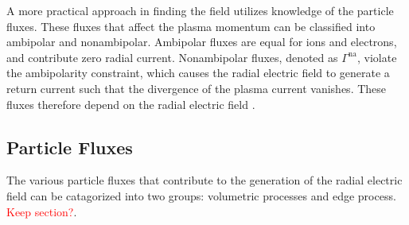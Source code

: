 \documentclass[a4paper]{article}
\newcommand\mynotes[1]{\textcolor{red}{#1}}
\begin{document}
A more practical approach in finding the field utilizes knowledge of the particle fluxes.
These fluxes that affect the plasma momentum can be classified into ambipolar and nonambipolar.
Ambipolar fluxes are equal for ions and electrons, and contribute zero radial current.
Nonambipolar fluxes, denoted as $\Gamma^\text{na}$, violate the ambipolarity constraint, which causes the radial electric field to generate a return current such that the divergence of the plasma current vanishes.
These fluxes therefore depend on the radial electric field \cite{callen_toroidal_2009}.

\subsection{Particle Fluxes}
The various particle fluxes that contribute to the generation of the radial electric field can be catagorized into two groups: volumetric processes and edge process. \mynotes{Keep section?}\cite{callen_toroidal_2009}.
\end{document}
